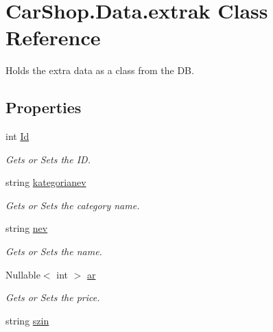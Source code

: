\hypertarget{class_car_shop_1_1_data_1_1extrak}{}\section{Car\+Shop.\+Data.\+extrak Class Reference}
\label{class_car_shop_1_1_data_1_1extrak}


Holds the extra data as a class from the DB.  


\subsection*{Properties}
\begin{DoxyCompactItemize}
\item 
int \mbox{\hyperlink{class_car_shop_1_1_data_1_1extrak_aa270776237b9d5e360264f39c5ec24ca}{Id}}
\begin{DoxyCompactList}\small\item\em Gets or Sets the ID. \end{DoxyCompactList}\item 
string \mbox{\hyperlink{class_car_shop_1_1_data_1_1extrak_acd9fd1734fc340eae70900872f242f46}{kategorianev}}
\begin{DoxyCompactList}\small\item\em Gets or Sets the category name. \end{DoxyCompactList}\item 
string \mbox{\hyperlink{class_car_shop_1_1_data_1_1extrak_afb32ab28449a871d47d383c67e3146fa}{nev}}
\begin{DoxyCompactList}\small\item\em Gets or Sets the name. \end{DoxyCompactList}\item 
Nullable$<$ int $>$ \mbox{\hyperlink{class_car_shop_1_1_data_1_1extrak_a734697251c8df37e5ebafa94add570b2}{ar}}
\begin{DoxyCompactList}\small\item\em Gets or Sets the price. \end{DoxyCompactList}\item 
string \mbox{\hyperlink{class_car_shop_1_1_data_1_1extrak_a1b4b2ce236ace401c6ad2d476b965c91}{szin}}

\end{DoxyCompactItemize}
